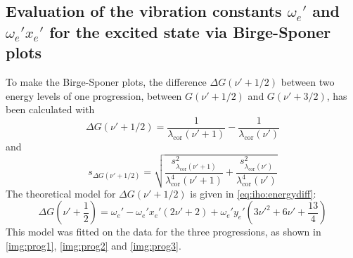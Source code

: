 \subsection{Evaluation of the vibration constants \texorpdfstring{$\omega_e'$}{we'} and \texorpdfstring{$\omega_e' x_e'$}{we'xe'} for the excited state via Birge-Sponer plots}
To make the Birge-Sponer plots,
the difference $\Delta G(\nu' +1/2)$ between two energy levels of one progression,
between $G(\nu' +1/2)$ and  $G(\nu' +3/2)$,
has been calculated with
\begin{equation}
  \Delta G(\nu' +1/2)=\frac{1}{\lambda_{\text{cor}}(\nu'+1)}-\frac{1}{\lambda_{\text{cor}}(\nu')}
\end{equation}
and
\begin{equation}
  s_{\Delta G(\nu' +1/2)}=
  \sqrt{\frac{s^2_{\lambda_{\text{cor}}(\nu'+1)}}{\lambda^4_{\text{cor}}(\nu'+1)}+
  \frac{s^2_{\lambda_{\text{cor}}(\nu')}}{\lambda^4_{\text{cor}}(\nu')}}
\end{equation}
The theoretical model for $\Delta G(\nu' +1/2)$ is given in \autoref{eq:iho:energydiff}:
\begin{equation}
  \Delta G(\nu' + \frac{1}{2})=\omega_e' - \omega_e' x_e'(2\nu'+2) + \omega_e' y_e'(3\nu'^2 + 6 \nu' +\frac{13}{4})
\end{equation}
This model was fitted on the data for the three progressions, as shown in \autoref{img:prog1},
\autoref{img:prog2} and \autoref{img:prog3}.

